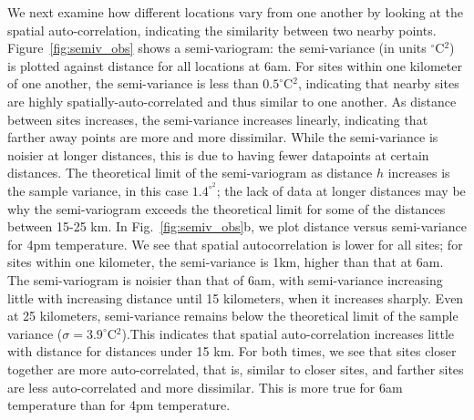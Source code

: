 \documentclass[draft,linenumbers]{agujournal}
\begin{document}
We next examine how different locations vary from one another by looking at the spatial auto-correlation, indicating the similarity between two nearby points. Figure~\ref{fig:semiv_obs} shows a semi-variogram: the semi-variance (in units $^\circ$C$^2$) is plotted against distance for all locations at 6am. For sites within one kilometer of one another, the semi-variance is less than $0.5^\circ$C$^2$, indicating that nearby sites are highly spatially-auto-correlated and thus similar to one another. 
As distance between sites increases, the semi-variance increases linearly, indicating that farther away points are more and more dissimilar. While the semi-variance is noisier at longer distances, this is due to having fewer datapoints at certain distances. 
The theoretical limit of the semi-variogram as distance $h$ increases is the sample variance, in this case $1.4^{\circ^2}$; the lack of data at longer distances may be why the semi-variogram exceeds the theoretical limit for some of the distances between 15-25 km. 
In Fig.~\ref{fig:semiv_obs}b, we plot distance versus semi-variance for 4pm temperature. We see that spatial autocorrelation is lower for all sites; for sites within one kilometer, the semi-variance is 1km, higher than that at 6am. The semi-variogram is noisier than that of 6am, with semi-variance increasing little with increasing distance until 15 kilometers, when it increases sharply. Even at 25 kilometers, semi-variance remains below the theoretical limit of the sample variance ($\sigma = 3.9^\circ$C$^2$).This indicates that spatial auto-correlation increases little with distance for distances under 15 km.
For both times, we see that sites closer together are more auto-correlated, that is, similar to closer sites, and farther sites are less auto-correlated and more dissimilar. This is more true for 6am temperature than for 4pm temperature. 
\end{document}
